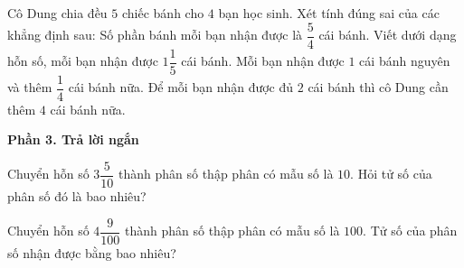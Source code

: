 \begin{ex} %
Cô Dung chia đều $5$ chiếc bánh cho $4$ bạn học sinh. Xét tính đúng sai của các khẳng định sau:
\choiceTF
{\True Số phần bánh mỗi bạn nhận được là $\dfrac{5}{4}$ cái bánh.}
{Viết dưới dạng hỗn số, mỗi bạn nhận được $1\dfrac{1}{5}$ cái bánh.}
{\True Mỗi bạn nhận được $1$ cái bánh nguyên và thêm $\dfrac{1}{4}$ cái bánh nữa.}
{Để mỗi bạn nhận được đủ $2$ cái bánh thì cô Dung cần thêm $4$ cái bánh nữa.}
\end{ex}

\textbf{Phần 3. Trả lời ngắn}

\begin{ex} %
Chuyển hỗn số $3\dfrac{5}{10}$ thành phân số thập phân có mẫu số là $10$. Hỏi tử số của phân số đó là bao nhiêu?
\end{ex}

\begin{ex} %
Chuyển hỗn số $4\dfrac{9}{100}$ thành phân số thập phân có mẫu số là $100$. Tử số của phân số nhận được bằng bao nhiêu?
\end{ex}

